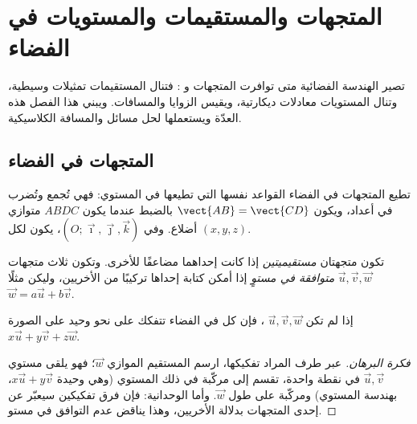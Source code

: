 \chapter{المتجهات والمستقيمات والمستويات في الفضاء}\label{ch:g12:space}

تصير الهندسة الفضائية  متى توافرت المتجهات و
: فتنال المستقيمات تمثيلات وسيطية، وتنال المستويات
معادلات ديكارتية، ويقيس  الزوايا والمسافات.
ويبني هذا الفصل هذه العدّة ويستعملها لحل مسائل 
والمسافة الكلاسيكية.

\section{المتجهات في الفضاء}

تطيع المتجهات في الفضاء القواعد نفسها التي تطيعها في المستوي: فهي تُجمع وتُضرب في أعداد،
ويكون $\vect{AB} = \vect{CD}$ بالضبط عندما يكون $ABDC$ متوازي أضلاع. وفي
 $(O; \vec\imath, \vec\jmath, \vec k)$، يكون لكل 
 $(x, y, z)$.

\begin{definition}\label{def:g12:space:collinear}
تكون متجهتان \emph{مستقيميتين} إذا كانت إحداهما مضاعفًا للأخرى. وتكون ثلاث
متجهات $\vec u, \vec v, \vec w$ \emph{متوافقة في مستوٍ} إذا أمكن كتابة
إحداها تركيبًا من الأخريين، وليكن مثلًا
$\vec w = a\vec u + b\vec v$.
\end{definition}

\begin{proposition}\label{prop:g12:space:basis}
إذا لم تكن $\vec u, \vec v, \vec w$ ، فإن كل  في الفضاء
تتفكك على نحو وحيد على الصورة $x\vec u + y\vec v + z\vec w$.
\end{proposition}

\begin{proof}[فكرة البرهان]
عبر طرف  المراد تفكيكها، ارسم المستقيم الموازي
 $\vec w$؛ فهو يلقى مستوي $\vec u, \vec v$ في نقطة واحدة،
تقسم  إلى مركّبة في ذلك المستوي (وهي وحيدة $x\vec u + y\vec
v$، بهندسة المستوي) ومركّبة على طول $\vec w$. وأما الوحدانية: فإن فرق
تفكيكين سيعبّر عن إحدى المتجهات بدلالة الأخريين،
وهذا يناقض عدم التوافق في مستو.
\end{proof}

